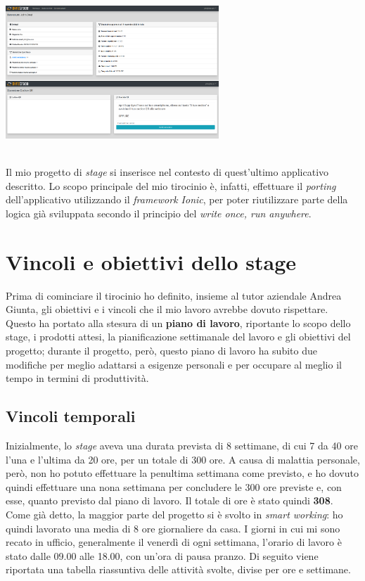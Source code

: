 \begin{minipage}{\linewidth}
  \centering
    \includegraphics[height=5cm]{immagini/webapp}
\end{minipage} \\

Il mio progetto di \textit{stage} si inserisce nel contesto di quest'ultimo applicativo descritto. Lo scopo principale del mio tirocinio è, infatti, effettuare il \textit{porting} dell'applicativo utilizzando il \textit{framework Ionic}, per poter riutilizzare parte della logica già sviluppata secondo il principio del \textit{write once, run anywhere}.


\section{Vincoli e obiettivi dello stage}

Prima di cominciare il tirocinio ho definito, insieme al tutor aziendale Andrea Giunta, gli obiettivi e i vincoli che il mio lavoro avrebbe dovuto rispettare. Questo ha portato alla stesura di un \textbf{piano di lavoro}, riportante lo scopo dello stage, i prodotti attesi, la pianificazione settimanale del lavoro e gli obiettivi del progetto; durante il progetto, però, questo piano di lavoro ha subito due modifiche per meglio adattarsi a esigenze personali e per occupare al meglio il tempo in termini di produttività.

\subsection{Vincoli temporali}

Inizialmente, lo \textit{stage} aveva una durata prevista di 8 settimane, di cui 7 da 40 ore l'una e l'ultima da 20 ore, per un totale di 300 ore. A causa di malattia personale, però, non ho potuto effettuare la penultima settimana come previsto, e ho dovuto quindi effettuare una nona settimana per concludere le 300 ore previste e, con esse, quanto previsto dal piano di lavoro. Il totale di ore è stato quindi \textbf{308}. \\
Come già detto, la maggior parte del progetto si è svolto in \textit{smart working}: ho quindi lavorato una media di 8 ore giornaliere da casa. I giorni in cui mi sono recato in ufficio, generalmente il venerdì di ogni settimana, l'orario di lavoro è stato dalle 09.00 alle 18.00, con un'ora di pausa pranzo. Di seguito viene riportata una tabella riassuntiva delle attività svolte, divise per ore e settimane.

